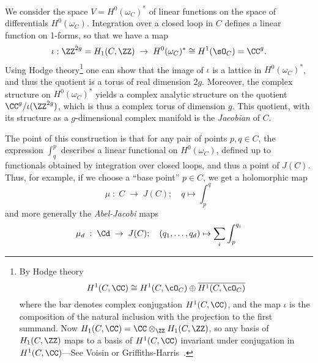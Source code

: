 We consider the space $V = H^0(\omega_C)^*$ of linear functions on the space of differentials $H^0(\omega_C)$.  Integration over a closed loop in $C$ defines a linear function on 1-forms, so that we have a map
$$
\iota: \ZZ^{2g} = H_1(C,\ZZ) \; \to \;  H^0(\omega_C)^* \cong H^1(\sO_C) = \CC^{g}.
$$
Using  Hodge theory\footnote{By Hodge theory 
$$
H^1(C, \CC) \cong H^1(C, \cO_C) \oplus \overline{H^1(C, \cO_C)}
$$
where the bar denotes complex conjugation $H^1(C, \CC)$, and the map $\iota$ is the composition of 
 the natural inclusion with the projection to the first summand.
 Now
$H_1(C,\CC) = \CC\otimes_\ZZ H_1(C,\ZZ)$, so any basis of $H_1(C,\ZZ)$ maps to a basis of 
 $H^1(C, \CC)$ invariant under conjugation in $H^1(C, \CC)$---See Voisin \cite{} or Griffiths-Harris~\cite{}. 
}
one can show that the image of $\iota$ is a lattice in $H^0(\omega_C)^*$, and thus the quotient
is a torus of real dimension $2g$. Moreover, the
complex structure on $H^0(\omega_C)^*$ yields a complex analytic structure on the quotient $\CC^{g}/\iota(\ZZ^{2g})$, which is thus a complex torus of  dimension $g$.  This quotient, with its structure as a $g$-dimensional complex manifold is the \emph{Jacobian} of $C$.

The point of this construction is that for any pair of points $p, q \in C$, the expression $\int_q^p$ describes a linear functional on $H^0(\omega_C)$, defined up to functionals obtained by integration over closed loops, and thus a point of $J(C)$. Thus, for example, if we choose a ``base point''  $p\in C$, we get a holomorphic map
$$
\mu \; : \; C \; \to \; J(C); \quad q\mapsto \int_{p}^{q}
$$
and more generally the \emph{Abel-Jacobi} maps
$$
\mu_d \; : \; \Cd \; \to \; J(C); \quad (q_1,\dots, q_d) \mapsto \sum_i \int_{p}^{q_i}
$$

%

